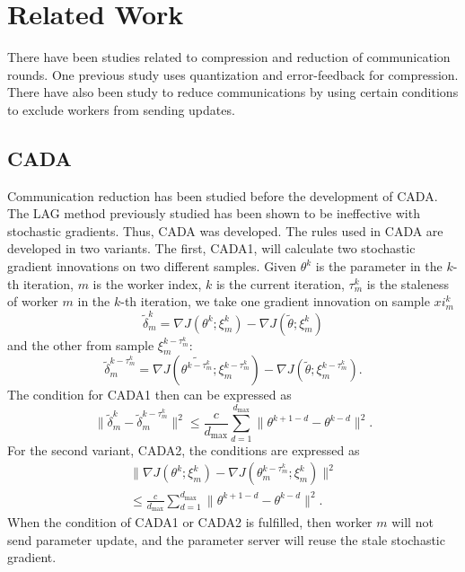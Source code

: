 \section{Related Work}
There have been studies related to compression and reduction of communication rounds. One previous study uses quantization and error-feedback\cite{Chen2022Efficient} for compression. There have also been study to reduce communications by using certain conditions to exclude workers from sending updates\cite{Chen2021CADA}.
\subsection{CADA}
Communication reduction has been studied before the development of CADA. The LAG method\cite{Chen2018LAG} previously studied has been shown to be ineffective with stochastic gradients\cite{Chen2021CADA}. Thus, CADA was developed. The rules used in CADA are developed in two variants. The first, CADA1, will calculate two stochastic gradient innovations on two different samples. Given $\theta^k$ is the parameter in the $k$-th iteration, $m$ is the worker index, $k$ is the current iteration, $\tau_m^k$ is the staleness of worker $m$ in the $k$-th iteration, we take one gradient innovation on sample $xi_m^k$
\begin{equation*}
  \tilde{\delta}_m^k = \nabla J(\theta^k;\xi_m^k) - \nabla J(\tilde{\theta};\xi_m^k)
\end{equation*}
and the other from sample $\xi_m^{k-\tau_m^k}$:
\begin{equation*}
  \tilde{\delta}_m^{k-\tau_m^k} = \nabla J(\tilde{\theta^{k-\tau_m^k}};\xi_m^{k-\tau_m^k}) - \nabla J(\tilde{\theta};\xi_m^{k-\tau_m^k}).
\end{equation*}
The condition for CADA1 then can be expressed as
\begin{equation}
  \|\tilde{\delta}_m^k - \tilde{\delta}_m^{k-\tau_m^k}\|^2 \leq \frac{c}{d_\mathrm{max}}\sum_{d=1}^{d_\mathrm{max}} \|\theta^{k+1-d} - \theta^{k-d}\|^2.
\end{equation}
For the second variant, CADA2, the conditions are expressed as
\begin{equation}
  \begin{split}
    \|\nabla J(\theta^k;\xi_m^k) - \nabla J(\theta_m^{k-\tau_m^k};\xi_m^k)\|^2 \\
    \leq
    \frac{c}{d_\mathrm{max}} \sum_{d=1}^{d_\mathrm{max}} \| \theta^{k+1-d} - \theta^{k-d} \|^2.
  \end{split}
\end{equation}
When the condition of CADA1 or CADA2 is fulfilled, then worker $m$ will not send parameter update, and the parameter server will reuse the stale stochastic gradient.

